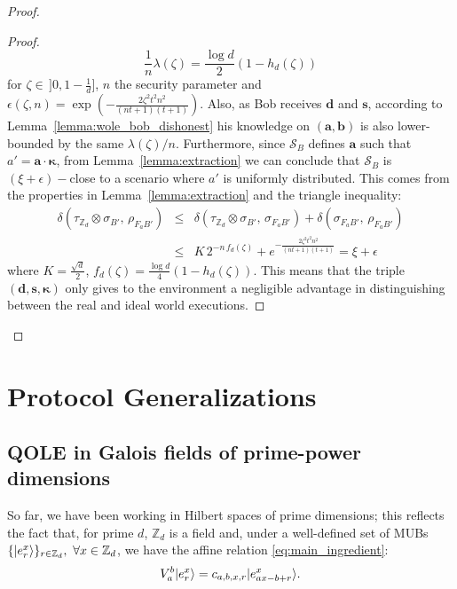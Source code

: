 \begin{proof}
\begin{proof}
$$\frac{1}{n}\lambda(\zeta) = \frac{\log d}{2}(1-h_d(\zeta))$$
for $\zeta\in\,]0, 1-\frac{1}{d}]$, $n$ the security parameter and $\epsilon(\zeta, n) = \exp( -\frac{2 \zeta^2t^2n^2}{(nt+1)(t+1)})$. Also, as Bob receives $\bm{d}$ and $\bm{s}$, according to Lemma~\ref{lemma:wole_bob_dishonest} his knowledge on $(\bm{a}, \bm{b})$ is also lower-bounded by the same $\lambda(\zeta)/n$. Furthermore, since $\mathcal{S}_B$ defines $\bm{a}$ such that $a' = \bm{a} \cdot \bm{\kappa}$, from Lemma~\ref{lemma:extraction} we can conclude that $\mathcal{S}_B$ is $(\xi + \epsilon)-$close to a scenario where $a'$ is uniformly distributed. This comes from the properties in Lemma~\ref{lemma:extraction} and the triangle inequality:
\begin{eqnarray*}
\delta( \tau_{\mathbb{Z}_d} \otimes \sigma_{B'},\, \rho_{F_a B'} ) &\leq& \delta( \tau_{\mathbb{Z}_d} \otimes \sigma_{B'},\, \sigma_{F_{a} B'} ) + \delta( \sigma_{F_{a} B'},\, \rho_{F_a B'} ) \\
&\leq& K\, 2^{-n \, f_d(\zeta)} + e^{ -\frac{2 \zeta^2t^2n^2}{(nt+1)(t+1)}}= \xi + \epsilon
\end{eqnarray*}
where $K = \frac{\sqrt{d}}{2}$, $f_d(\zeta) = \frac{\log d}{4} (1-h_d(\zeta))$. This means that the triple $(\bm{d}, \bm{s}, \bm{\kappa})$ only gives to the environment a negligible advantage in distinguishing between the real and ideal world executions.
\end{proof}
\end{proof}


\section{Protocol Generalizations}
\label{sec:protgeneral}

\subsection{QOLE in Galois fields of prime-power dimensions} \label{sec:galois_ext}

So far, we have been working in Hilbert spaces of prime dimensions; this reflects the fact that, for prime $d$,  $\mathbb{Z}_d$ is a field  and, under a well-defined set of MUBs $\{ | e^x_r \rangle \}_{r\in\mathbb{Z}_d},\ \forall x\in\mathbb{Z}_d$, we have the affine relation \eqref{eq:main_ingredient}:
\begin{equation*}
V^b_a | e^x_r \rangle = c_{a, b, x, r} | e^x_{ax - b +r} \rangle.
\end{equation*}


